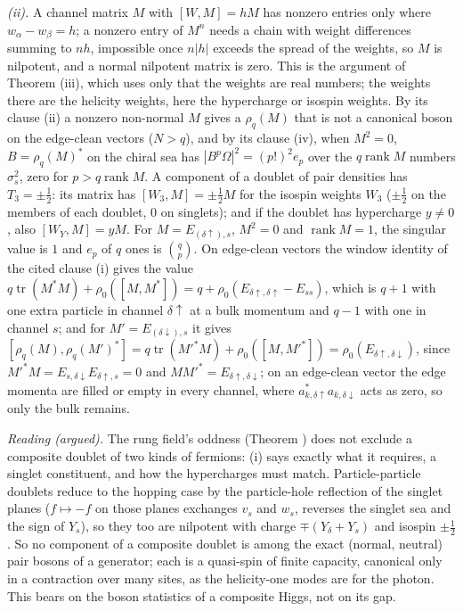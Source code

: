 \emph{(ii).} A channel matrix $M$ with $[W, M] = hM$ has nonzero entries only where $w_{\alpha} - w_{\beta} = h$; a nonzero entry of $M^{n}$ needs a chain with weight differences summing to $nh$, impossible once $n|h|$ exceeds the spread of the weights, so $M$ is nilpotent, and a normal nilpotent matrix is zero. This is the argument of Theorem (iii), which uses only that the weights are real numbers; the weights there are the helicity weights, here the hypercharge or isospin weights. By its clause (ii) a nonzero non-normal $M$ gives a $\rho_{q}(M)$ that is not a canonical boson on the edge-clean vectors ($N > q$), and by its clause (iv), when $M^{2} = 0$, $B = \rho_{q}(M)^{*}$ on the chiral sea has $|B^{p}\Omega|^{2} = (p!)^{2}e_{p}$ over the $q\operatorname{rank}M$ numbers $\sigma_{s}^{2}$, zero for $p > q\operatorname{rank}M$. A component of a doublet of pair densities has $T_{3} = \pm\tfrac12$: its matrix has $[W_{3}, M] = \pm\tfrac12M$ for the isospin weights $W_{3}$ ($\pm\tfrac12$ on the members of each doublet, $0$ on singlets); and if the doublet has hypercharge $y \ne 0$, also $[W_{Y}, M] = yM$. For $M = E_{(\delta\uparrow), s}$, $M^{2} = 0$ and $\operatorname{rank}M = 1$, the singular value is $1$ and $e_{p}$ of $q$ ones is $\binom{q}{p}$. On edge-clean vectors the window identity of the cited clause (i) gives the value $q\operatorname{tr}(M^{*}M) + \rho_{0}([M, M^{*}]) = q + \rho_{0}(E_{\delta\uparrow,\delta\uparrow} - E_{ss})$, which is $q + 1$ with one extra particle in channel $\delta\uparrow$ at a bulk momentum and $q - 1$ with one in channel $s$; and for $M' = E_{(\delta\downarrow), s}$ it gives $[\rho_{q}(M), \rho_{q}(M')^{*}] = q\operatorname{tr}(M'^{*}M) + \rho_{0}([M, M'^{*}]) = \rho_{0}(E_{\delta\uparrow,\delta\downarrow})$, since $M'^{*}M = E_{s,\delta\downarrow}E_{\delta\uparrow,s} = 0$ and $MM'^{*} = E_{\delta\uparrow,\delta\downarrow}$; on an edge-clean vector the edge momenta are filled or empty in every channel, where $a_{k,\delta\uparrow}^{*}a_{k,\delta\downarrow}$ acts as zero, so only the bulk remains.

\emph{Reading (argued).} The rung field's oddness (Theorem ) does not exclude a composite doublet of two kinds of fermions: (i) says exactly what it requires, a singlet constituent, and how the hypercharges must match. Particle-particle doublets reduce to the hopping case by the particle-hole reflection of the singlet planes ($f \mapsto -f$ on those planes exchanges $v_{s}$ and $w_{s}$, reverses the singlet sea and the sign of $Y_{s}$), so they too are nilpotent with charge $\mp(Y_{\delta} + Y_{s})$ and isospin $\pm\tfrac12$. So no component of a composite doublet is among the exact (normal, neutral) pair bosons of a generator; each is a quasi-spin of finite capacity, canonical only in a contraction over many sites, as the helicity-one modes are for the photon. This bears on the boson statistics of a composite Higgs, not on its gap.
